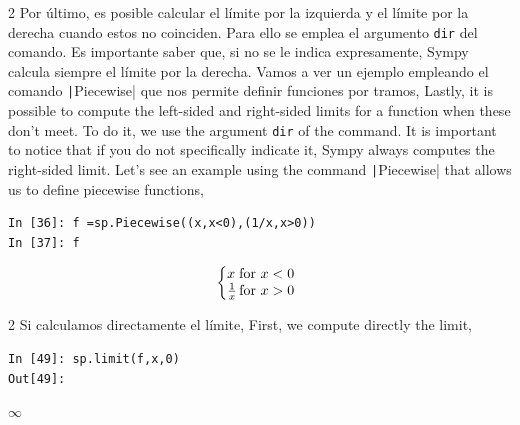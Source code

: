 \begin{paracol}{2}
Por último, es posible calcular el límite por la izquierda y el límite por la derecha cuando estos no coinciden. Para ello se emplea el argumento \texttt{dir} del comando. Es importante saber que, si no se le indica expresamente, Sympy calcula siempre el límite por la derecha. Vamos a ver un ejemplo empleando el comando \texttt|Piecewise| que nos permite definir funciones por tramos,
\switchcolumn
Lastly, it is possible to compute the left-sided and right-sided limits for a function when these don't meet. To do it, we use the argument \texttt{dir} of the command. It is important to notice that if you do not specifically indicate it, Sympy always computes the right-sided limit. Let's see an example using the command \texttt|Piecewise| that allows us to define piecewise functions,
\end{paracol}
\begin{center}
	\begin{minipage}{.6\textwidth}
		\begin{verbatim}
In [36]: f =sp.Piecewise((x,x<0),(1/x,x>0))
In [37]: f
		\end{verbatim}
				\begin{equation*}
			\left\{
			\begin{array}{@{}l@{\,}l}
				x &  \text{for}\ x<0\\
			 \frac{1}{x} & \text{for}\ x>0
			\end{array}
			\right.
		\end{equation*}
	\end{minipage}
\end{center}
\begin{paracol}{2}
Si calculamos directamente el límite,
\switchcolumn
First, we compute directly the limit,
\end{paracol}
\begin{center}
	\begin{minipage}{.6\textwidth}
		\begin{verbatim}
In [49]: sp.limit(f,x,0)
Out[49]: 
		\end{verbatim}
$\infty$
	\end{minipage}
\end{center}

